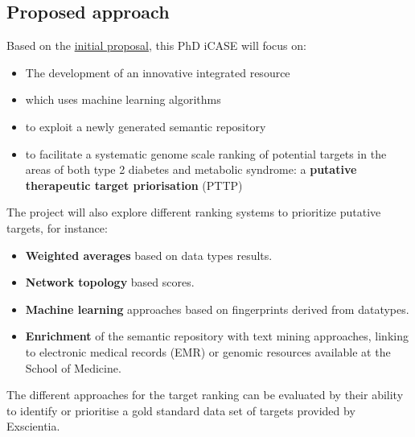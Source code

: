 \subsection{Proposed approach}
Based on the \href{https://goo.gl/QrfdfY}{initial proposal}, this PhD iCASE will focus on:
\begin{itemize}
    \item The development of an innovative integrated resource 
    \item which uses machine learning algorithms
    \item to exploit a newly generated semantic repository
    \item to facilitate a systematic genome scale ranking of potential targets in the areas of both type 2 diabetes and metabolic syndrome: a \textbf{putative therapeutic target priorisation} (PTTP)
\end{itemize}


The project will also explore different ranking systems to prioritize putative targets, for instance:


\begin{itemize}
    \item \textbf{Weighted averages} based on data types results.
    \item \textbf{Network topology} based scores.
    \item \textbf{Machine learning} approaches based on fingerprints derived from datatypes.
    \item \textbf{Enrichment} of the semantic repository with text mining approaches, linking to electronic medical records (EMR) or genomic resources available at the School of Medicine.
\end{itemize}

The different approaches for the target ranking can be evaluated by their ability to identify or prioritise a gold standard data set of targets provided by Exscientia.